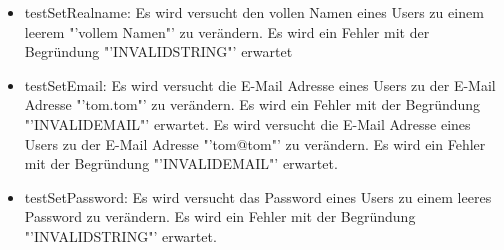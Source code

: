 \begin{itemize}
\begin{itemize}
\begin{itemize}
            \item testSetRealname: Es wird versucht den vollen Namen eines Users zu einem leerem "'vollem Namen"' zu verändern. Es wird ein Fehler mit der Begründung "'INVALIDSTRING"' erwartet
            \item testSetEmail: Es wird versucht die E-Mail Adresse eines Users zu der E-Mail Adresse "'tom.tom"' zu verändern. Es wird ein Fehler mit der Begründung "'INVALIDEMAIL"' erwartet. Es wird versucht die E-Mail Adresse eines Users zu der E-Mail Adresse "'tom@tom"' zu verändern. Es wird ein Fehler mit der Begründung "'INVALIDEMAIL"' erwartet.
            \item testSetPassword: Es wird versucht das Password eines Users zu einem leeres Password zu verändern. Es wird ein Fehler mit der Begründung "'INVALIDSTRING"' erwartet.
        
          \end{itemize}
      \end{itemize}
\end{itemize}

